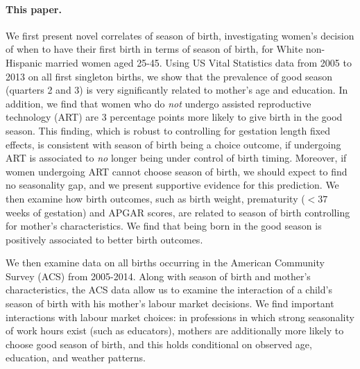 \documentclass[a4paper, 12 pt]{article}
\theoremstyle{plain}
\begin{document}
\begin{doublespace}
\paragraph{This paper.} We first present novel correlates of season of birth, investigating women's decision of when to have their first birth in terms of season of birth, for White non-Hispanic married women aged 25-45. Using US Vital Statistics data from 2005 to 2013 on all first singleton births, we show that the prevalence of good season (quarters 2 and 3) is very significantly related to mother's age and education. In addition, we find that women who do \emph{not} undergo assisted reproductive technology (ART) are 3 percentage points more likely to give birth in the good season. This finding, which is robust to controlling for gestation length fixed effects, is consistent with season of birth being a choice outcome, if undergoing ART is associated to \emph{no} longer being under control of birth timing. Moreover, if women undergoing ART cannot choose season of birth, we should expect to find no seasonality gap, and we present supportive evidence for this prediction. We then examine how birth outcomes, such as birth weight, prematurity ($<37$ weeks of gestation) and APGAR scores, are related to season of birth controlling for mother's characteristics. We find that being born in the good season is positively associated to better birth outcomes.

We then examine data on all births occurring in the American Community Survey (ACS) from 2005-2014.  Along with season of birth and mother's characteristics, the ACS data allow us to examine the interaction of a child's season of birth with his mother's labour market decisions.  We find important interactions with labour market choices: in professions in which strong seasonality of work hours exist (such as educators), mothers are additionally more likely to choose good season of birth, and this holds conditional on observed age, education, and weather patterns.



\end{doublespace}
\end{document}
